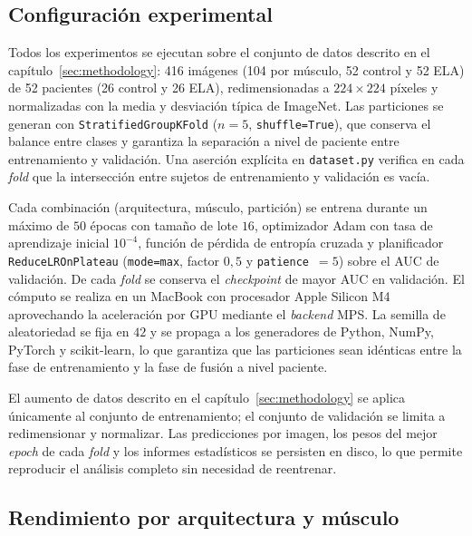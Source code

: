 \documentclass[12pt]{extarticle}
\numberwithin{equation}{section}
\begin{document}
\begin{refsection}
\subsection{Configuración experimental}\label{subsec:resultados-config}

Todos los experimentos se ejecutan sobre el conjunto de datos descrito en el capítulo~\ref{sec:methodology}: 416 imágenes (104 por músculo, 52 control y 52 ELA) de 52 pacientes (26 control y 26 ELA), redimensionadas a $224\times 224$ píxeles y normalizadas con la media y desviación típica de ImageNet. Las particiones se generan con \texttt{Stratified\allowbreak Group\allowbreak KFold} ($n=5$, \texttt{shuffle=True}), que conserva el balance entre clases y garantiza la separación a nivel de paciente entre entrenamiento y validación. Una aserción explícita en \texttt{dataset.py} verifica en cada \textit{fold} que la intersección entre sujetos de entrenamiento y validación es vacía.

Cada combinación (arquitectura, músculo, partición) se entrena durante un máximo de $50$ épocas con tamaño de lote $16$, optimizador Adam con tasa de aprendizaje inicial $10^{-4}$, función de pérdida de entropía cruzada y planificador \texttt{Reduce\allowbreak LROn\allowbreak Plateau} (\texttt{mode=max}, factor $0{,}5$ y \texttt{patience}~$=5$) sobre el AUC de validación. De cada \textit{fold} se conserva el \textit{checkpoint} de mayor AUC en validación. El cómputo se realiza en un MacBook con procesador Apple Silicon M4 aprovechando la aceleración por GPU mediante el \textit{backend} MPS. La semilla de aleatoriedad se fija en $42$ y se propaga a los generadores de Python, NumPy, PyTorch y scikit-learn, lo que garantiza que las particiones sean idénticas entre la fase de entrenamiento y la fase de fusión a nivel paciente.

El aumento de datos descrito en el capítulo~\ref{sec:methodology} se aplica únicamente al conjunto de entrenamiento; el conjunto de validación se limita a redimensionar y normalizar. Las predicciones por imagen, los pesos del mejor \textit{epoch} de cada \textit{fold} y los informes estadísticos se persisten en disco, lo que permite reproducir el análisis completo sin necesidad de reentrenar.

\subsection{Rendimiento por arquitectura y músculo}\label{subsec:resultados-por-musculo}


\end{refsection}
\end{document}
